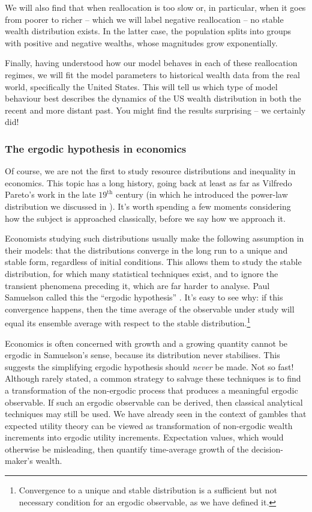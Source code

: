 We will also find that when reallocation is too slow or, in particular, when it goes from poorer to richer -- which we will label negative reallocation -- no stable wealth distribution exists. In the latter case, the population splits into groups with positive and negative wealths, whose magnitudes grow exponentially.

Finally, having understood how our model behaves in each of these reallocation regimes, we will fit the model parameters to historical wealth data from the real world, specifically the United States. This will tell us which type of model behaviour best describes the dynamics of the US wealth distribution in both the recent and more distant past. You might find the results surprising -- we certainly did!


\subsubsection{The ergodic hypothesis in economics}
Of course, we are not the first to study resource distributions and inequality in economics. This topic has a long history, going back at least as far as Vilfredo Pareto's work in the late $19^\text{th}$ century \cite{Pareto1897} (in which he introduced the power-law distribution we discussed in ). It's worth spending a few moments considering how the subject is approached classically, before we say how we approach it.

Economists studying such distributions usually make the following assumption in their models: that the distributions converge in the long run to a unique and stable form, regardless of initial conditions. This allows them to study the stable distribution, for which many statistical techniques exist, and to ignore the transient phenomena preceding it, which are far harder to analyse. Paul Samuelson called this the ``ergodic hypothesis'' \cite[pp.~11-12]{Samuelson1968}. It's easy to see why: if this convergence happens, then the time average of the observable under study will equal its ensemble average with respect to the stable distribution.\footnote{Convergence to a unique and stable distribution is a sufficient but not necessary condition for an ergodic observable, as we have defined it.}

Economics is often concerned with growth and a growing quantity cannot be ergodic in Samuelson's sense, because its distribution never stabilises. This suggests the simplifying ergodic hypothesis should \textit{never} be made. Not so fast! Although rarely stated, a common strategy to salvage these techniques is to find a transformation of the non-ergodic process that produces a meaningful ergodic observable. If such an ergodic observable can be derived, then classical analytical techniques may still be used. We have already seen in the context of gambles that expected utility theory can be viewed as transformation of non-ergodic wealth increments into ergodic utility increments. Expectation values, which would otherwise be misleading, then quantify time-average growth of the decision-maker's wealth.

